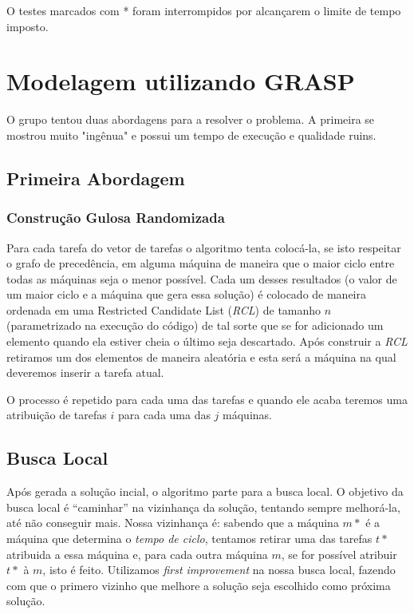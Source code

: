 \documentclass{report}
\begin{document}
O testes marcados com * foram interrompidos por alcançarem o limite de tempo imposto.



\chapter{Modelagem utilizando GRASP}

O grupo tentou duas abordagens para a resolver o problema. A primeira se
mostrou muito "ingênua" e possui um tempo de execução e qualidade ruins.

\section{Primeira Abordagem}

\subsection{Construção Gulosa Randomizada}

Para cada tarefa do vetor de tarefas o algoritmo tenta colocá-la, se
isto respeitar o grafo de precedência, em alguma
máquina de maneira que o maior ciclo entre todas as máquinas
seja o menor possível. Cada um desses resultados (o valor de um maior ciclo e
a máquina que gera essa solução)
é colocado de maneira ordenada em uma Restricted Candidate List (\emph{RCL})
de tamanho $n$ (parametrizado na execução do código)
de tal sorte que se for adicionado um elemento quando ela estiver
cheia o último seja descartado. Após construir a \emph{RCL} retiramos um dos
elementos de maneira aleatória e esta será a máquina na qual deveremos inserir
a tarefa atual.

O processo é repetido para cada uma das tarefas e quando ele acaba teremos
uma atribuição de tarefas $i$ para cada uma das $j$ máquinas.

\section{Busca Local}

Após gerada a solução incial, o algoritmo parte para a busca local.
O objetivo da busca local é ``caminhar'' na
vizinhança da solução, tentando sempre melhorá-la, até não conseguir mais.
Nossa vizinhança é: sabendo que a máquina $m*$
é a máquina que determina o \emph{tempo de ciclo},
tentamos retirar uma das tarefas $t*$ atribuida a essa máquina e, para cada
outra máquina $m$, se for possível atribuir $t*$ à $m$, isto é feito.
Utilizamos \textit{first improvement} na nossa busca
local, fazendo com que o primero vizinho que melhore a solução seja
escolhido como próxima solução.
\end{document}
